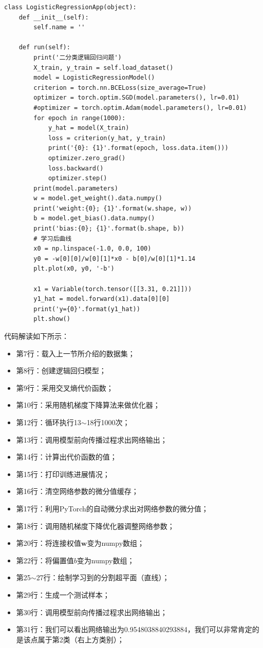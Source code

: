 \documentclass[UTF8]{article}
\begin{document}
\begin{lstlisting}
class LogisticRegressionApp(object):
    def __init__(self):
        self.name = ''

    def run(self):
        print('二分类逻辑回归问题')
        X_train, y_train = self.load_dataset()
        model = LogisticRegressionModel()
        criterion = torch.nn.BCELoss(size_average=True)
        optimizer = torch.optim.SGD(model.parameters(), lr=0.01)
        #optimizer = torch.optim.Adam(model.parameters(), lr=0.01)
        for epoch in range(1000):
            y_hat = model(X_train)
            loss = criterion(y_hat, y_train)
            print('{0}: {1}'.format(epoch, loss.data.item()))
            optimizer.zero_grad()
            loss.backward()
            optimizer.step()
        print(model.parameters)
        w = model.get_weight().data.numpy()
        print('weight:{0}; {1}'.format(w.shape, w))
        b = model.get_bias().data.numpy()
        print('bias:{0}; {1}'.format(b.shape, b))
        # 学习后曲线
        x0 = np.linspace(-1.0, 0.0, 100)
        y0 = -w[0][0]/w[0][1]*x0 - b[0]/w[0][1]*1.14
        plt.plot(x0, y0, '-b')

        x1 = Variable(torch.tensor([[3.31, 0.21]]))
        y1_hat = model.forward(x1).data[0][0]
        print('y={0}'.format(y1_hat))
        plt.show()
\end{lstlisting}
代码解读如下所示：
\begin{itemize}
\item 第7行：载入上一节所介绍的数据集；
\item 第8行：创建逻辑回归模型；
\item 第9行：采用交叉熵代价函数；
\item 第10行：采用随机梯度下降算法来做优化器；
\item 第12行：循环执行13$\sim$18行1000次；
\item 第13行：调用模型前向传播过程求出网络输出；
\item 第14行：计算出代价函数的值；
\item 第15行：打印训练进展情况；
\item 第16行：清空网络参数的微分值缓存；
\item 第17行：利用PyTorch的自动微分求出对网络参数的微分值；
\item 第18行：调用随机梯度下降优化器调整网络参数；
\item 第20行：将连接权值$\boldsymbol{w}$变为numpy数组；
\item 第22行：将偏置值$b$变为numpy数组；
\item 第25$\sim$27行：绘制学习到的分割超平面（直线）；
\item 第29行：生成一个测试样本；
\item 第30行：调用模型前向传播过程求出网络输出；
\item 第31行：我们可以看出网络输出为0.9548038840293884，我们可以非常肯定的是该点属于第2类（右上方类别）；
\end{itemize}
\end{document}
